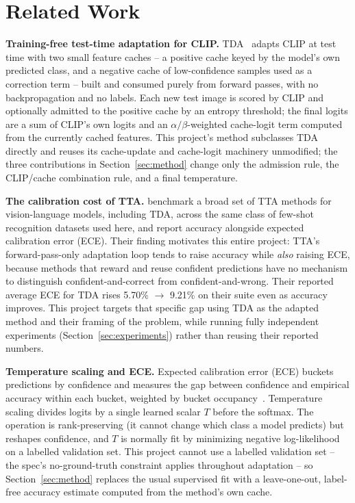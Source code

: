 \section{Related Work}

\textbf{Training-free test-time adaptation for CLIP.} TDA~\cite{karmanov2024tda} adapts CLIP
at test time with two small feature caches -- a positive cache keyed by the model's own
predicted class, and a negative cache of low-confidence samples used as a correction term --
built and consumed purely from forward passes, with no backpropagation and no labels. Each new
test image is scored by CLIP and optionally admitted to the positive cache by an entropy
threshold; the final logits are a sum of CLIP's own logits and an $\alpha/\beta$-weighted
cache-logit term computed from the currently cached features. This project's
method subclasses TDA directly and reuses its cache-update and cache-logit machinery
unmodified; the three contributions in Section~\ref{sec:method}
change only the admission rule, the CLIP/cache combination rule, and a final temperature.

\textbf{The calibration cost of TTA.} \citet{sheng2025illusion} benchmark a broad set of TTA
methods for vision-language models, including TDA, across the same class of few-shot
recognition datasets used here, and report accuracy alongside expected calibration error
(ECE). Their finding motivates this entire project: TTA's forward-pass-only adaptation loop
tends to raise accuracy while \emph{also} raising ECE, because methods that reward and reuse
confident predictions have no mechanism to distinguish confident-and-correct from
confident-and-wrong. Their reported average ECE for TDA rises 5.70\% $\rightarrow$ 9.21\% on
their suite even as accuracy improves. This project targets that specific gap using TDA as the
adapted method and their framing of the problem, while running fully independent
experiments (Section~\ref{sec:experiments}) rather than reusing their reported numbers.

\textbf{Temperature scaling and ECE.} Expected calibration error (ECE) buckets predictions by
confidence and measures the gap between confidence and empirical accuracy within each bucket,
weighted by bucket occupancy~\cite{guo2017calibration}. Temperature scaling divides logits by
a single learned scalar $T$ before the softmax. The operation is rank-preserving (it cannot
change which class a model predicts) but reshapes confidence, and $T$ is normally fit by
minimizing negative log-likelihood on a labelled validation set. This project cannot use a
labelled validation set -- the spec's no-ground-truth constraint applies throughout adaptation -- so
Section~\ref{sec:method} replaces the usual supervised fit with a leave-one-out, label-free
accuracy estimate computed from the method's own cache.
